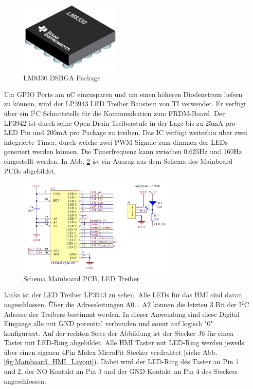 \begin{figure}[H]
	\includegraphics[draft=false,width=0.45\textwidth]{Illustrationen/6-Umsetzung/DSBGA_Package.png}
	\caption{LM8330 DSBGA Package \protect\cite{DSBGA_Package}}
	\label{fig:DSBGA_Package}
\end{figure}

Um GPIO Ports am uC einzusparen und um einen höheren Diodenstrom liefern zu können, wird der LP3943 LED Treiber Baustein von TI verwendet. Er verfügt über ein I$^{2}$C Schnittstelle für die Kommunikation zum FRDM-Board. Der LP3942 ist durch seine Open-Drain Treiberstufe in der Lage bis zu 25mA pro LED Pin und 200mA pro Package zu treiben. Das IC verfügt weiterhin über zwei integrierte Timer, durch welche zwei PWM Signale zum dimmen der LEDs generiert werden können. Die Timerfrequenz kann zwischen 0.625Hz und 160Hz eingestellt werden. In Abb. \ref{fig:Mainboard_LED_Driver_LP3943} ist ein Auszug aus dem Schema des Mainboard PCBs abgebildet. 

\begin{figure}[H]
	\includegraphics[draft=false,width=0.7\textwidth]{Illustrationen/6-Umsetzung/Schema_Mainboard_LP39431.png}
	\caption{Schema Mainboard PCB, LED Treiber}
	\label{fig:Mainboard_LED_Driver_LP3943}
\end{figure}

Links ist der LED Treiber LP3943 zu sehen. Alle LEDs für das HMI sind daran angeschlossen. Über die Adressleitungen A0... A2 können die letzten 3 Bit der I$^{2}$C Adresse des Treibers bestimmt werden. In dieser Anwendung sind diese Digital Eingänge alle mit GND potential verbunden und somit auf logisch "0" konfiguriert. Auf der rechten Seite der Abbildung ist der Stecker J6 für einen Taster mit LED-Ring abgebildet. Alle HMI Taster mit LED-Ring werden jeweils über einen eigenen 4Pin Molex MicroFit Stecker verdrahtet (siehe Abb. \ref{fig:Mainboard_HMI_Layout}). Dabei wird der LED-Ring des Taster an Pin 1 und 2, der NO Kontakt an Pin 3 und der GND Kontakt an Pin 4 des Steckers angeschlossen.

